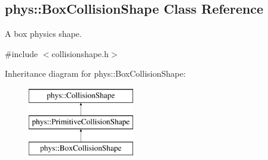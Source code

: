 \hypertarget{classphys_1_1BoxCollisionShape}{
\subsection{phys::BoxCollisionShape Class Reference}
\label{classphys_1_1BoxCollisionShape}
}


A box physics shape.  




{\ttfamily \#include $<$collisionshape.h$>$}

Inheritance diagram for phys::BoxCollisionShape:\begin{figure}[H]
\begin{center}
\leavevmode
\includegraphics[height=3.000000cm]{classphys_1_1BoxCollisionShape}
\end{center}
\end{figure}
